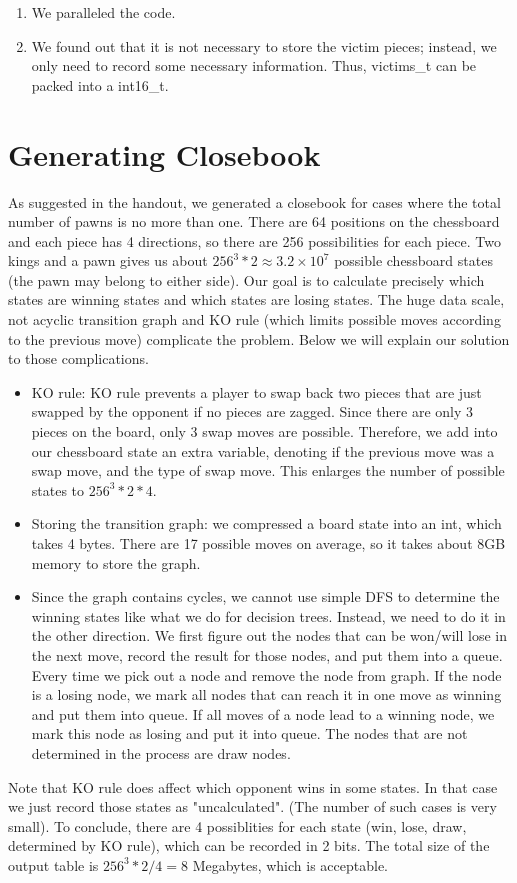 \documentclass[10pt,twosidep]{article}
\begin{document}
\begin{enumerate}
  \item We paralleled the code. 
  
  \item We found  out that it is not necessary to store the victim pieces; instead, we only need to record some necessary information. Thus, victims\_t can be packed into a int16\_t. 
  
\end{enumerate}

\section{Generating Closebook}
	As suggested in the handout, we generated a closebook 
	for cases where the total number of pawns is no more than one. 
	There are 64 positions on the chessboard and each piece has 4 directions, 
	so there are 256 possibilities for each piece. 
	Two kings and a pawn gives us about $256^3*2\approx 3.2\times 10^7$ possible chessboard states 
	(the pawn may belong to either side).
	Our goal is to calculate precisely which states are winning states and which states are losing states.
	The huge data scale, not acyclic transition graph and KO rule 
	(which limits possible moves according to the previous move) complicate the problem.
	Below we will explain our solution to those complications. 

	\begin{itemize}
	\item KO rule: KO rule prevents a player to swap back two pieces that are just swapped by the opponent 
	if no pieces are zagged. Since there are only 3 pieces on the board, only 3 swap moves are possible. 
	Therefore, we add into our chessboard state an extra variable, denoting if the previous move was a swap move, 
	and the type of swap move. This enlarges the number of possible states to $256^3*2*4$.
	\item Storing the transition graph: we compressed a board state into an int, which takes 4 bytes. 
	There are 17 possible moves on average, so it takes about 8GB memory to store the graph. 
	\item Since the graph contains cycles, 
	we cannot use simple DFS to determine the winning states like what we do for decision trees. Instead, 
	we need to do it in the other direction. 
	We first figure out the nodes that can be won/will lose in the next move, 
	record the result for those nodes, and put them into a queue. 
	Every time we pick out a node and remove the node from graph. 
	If the node is a losing node, we mark all nodes that can reach it in one move as winning and put them into queue. 
	If all moves of a node lead to a winning node, we mark this node as losing and put it into queue. 
	The nodes that are not determined in the process are draw nodes. 
	\end{itemize}
	Note that KO rule does affect which opponent wins in some states. In that case 
	we just record those states as "uncalculated". (The number of such cases is very small).
	To conclude, there are 4 possiblities for each state (win, lose, draw, determined by KO rule), 
	which can be recorded in 2 bits. The total size of the output table
	is $256^3*2/4=8$ Megabytes, which is acceptable.
\end{document}
